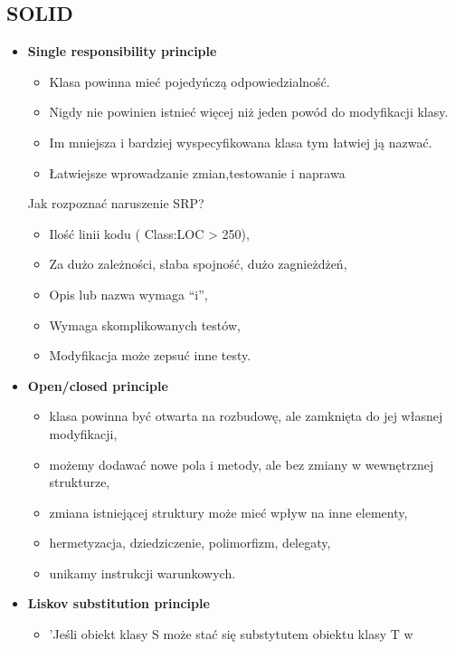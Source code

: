 \documentclass[a4paper]{article}
\begin{document}
    \subsection{SOLID}

    \begin{itemize}
        \item \textbf{Single responsibility principle}
        \begin{itemize}
            \item Klasa powinna mieć pojedyńczą odpowiedzialność.
            \item Nigdy nie powinien istnieć więcej niż jeden powód do modyfikacji klasy.
            \item Im mniejsza i bardziej wyspecyfikowana klasa tym łatwiej ją nazwać.
            \item Łatwiejsze wprowadzanie zmian,testowanie i naprawa
        \end{itemize}
        Jak rozpoznać naruszenie SRP?
        \begin{itemize}
            \item Ilość linii kodu ( Class:LOC > 250),
            \item Za dużo zależności, słaba spojność, dużo zagnieżdżeń,
            \item Opis lub nazwa wymaga “i”,
            \item Wymaga skomplikowanych testów,
            \item Modyfikacja może zepsuć inne testy.
        \end{itemize}
        \item \textbf{Open/closed principle}
        \begin{itemize}
            \item klasa powinna być otwarta na rozbudowę, ale zamknięta do jej własnej modyfikacji,
            \item możemy dodawać nowe pola i metody, ale bez zmiany w wewnętrznej strukturze,
            \item zmiana istniejącej struktury może mieć wpływ na inne elementy,
            \item hermetyzacja, dziedziczenie, polimorfizm, delegaty,
            \item unikamy instrukcji warunkowych.
        \end{itemize}
        \item \textbf{Liskov substitution principle}
        \begin{itemize}
            \item 'Jeśli obiekt klasy S może stać się substytutem obiektu klasy T w

\end{itemize}
\end{itemize}
\end{document}
